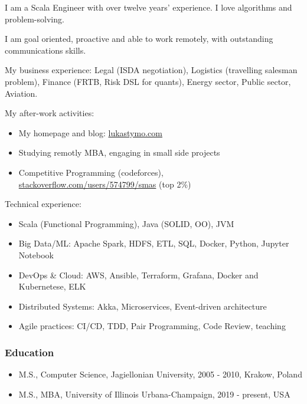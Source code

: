 \documentclass[
]{rss}
\author{}
\date{}
\providecommand{\tightlist}{%
  \setlength{\itemsep}{0pt}\setlength{\parskip}{0pt}}
\begin{document}
\address{\\[-9pt] lukas@codeily.com | lukastymo.com}
\begin{resume}

I am a Scala Engineer with over twelve years' experience. I love
algorithms and problem-solving.

I am goal oriented, proactive and able to work remotely, with
outstanding communications skills.

My business experience: Legal (ISDA negotiation), Logistics (travelling
salesman problem), Finance (FRTB, Risk DSL for quants), Energy sector,
Public sector, Aviation.

My after-work activities:

\begin{itemize}
\tightlist
\item
  My homepage and blog: \href{https://lukastymo.com}{lukastymo.com}
\item
  Studying remotly MBA, engaging in small side projects
\item
  Competitive Programming (codeforces),
  \href{https://stackoverflow.com/users/574799/smas}{stackoverflow.com/users/574799/smas}
  (top 2\%)
\end{itemize}

Technical experience:

\begin{itemize}
\tightlist
\item
  Scala (Functional Programming), Java (SOLID, OO), JVM
\item
  Big Data/ML: Apache Spark, HDFS, ETL, SQL, Docker, Python, Jupyter
  Notebook
\item
  DevOps \& Cloud: AWS, Ansible, Terraform, Grafana, Docker and
  Kubernetese, ELK
\item
  Distributed Systems: Akka, Microservices, Event-driven architecture
\item
  Agile practices: CI/CD, TDD, Pair Programming, Code Review, teaching
\end{itemize}

\hypertarget{education}{%
\subsubsection{Education}\label{education}}

\begin{itemize}
\tightlist
\item
  M.S., Computer Science, Jagiellonian University, 2005 - 2010, Krakow,
  Poland
\item
  M.S., MBA, University of Illinois Urbana-Champaign, 2019 - present,
  USA
\end{itemize}


\end{resume}
\end{document}
